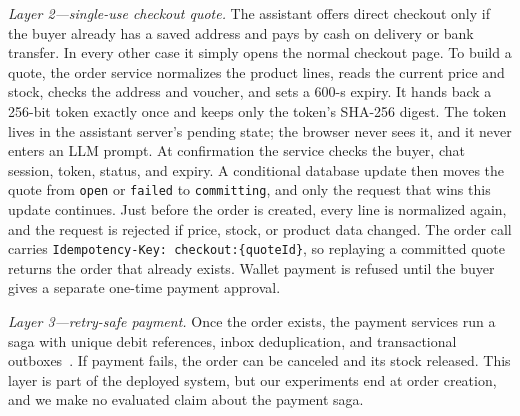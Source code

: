 \documentclass{IEEEtran}
\newcommand{\code}[1]{\texttt{\small #1}}
\begin{document}
\textit{Layer 2---single-use checkout quote.} The assistant offers direct checkout only if the buyer already has a saved address and pays by cash on delivery or bank transfer. In every other case it simply opens the normal checkout page. To build a quote, the order service normalizes the product lines, reads the current price and stock, checks the address and voucher, and sets a 600-s expiry. It hands back a 256-bit token exactly once and keeps only the token's SHA-256 digest. The token lives in the assistant server's pending state; the browser never sees it, and it never enters an LLM prompt. At confirmation the service checks the buyer, chat session, token, status, and expiry. A conditional database update then moves the quote from \code{open} or \code{failed} to \code{committing}, and only the request that wins this update continues. Just before the order is created, every line is normalized again, and the request is rejected if price, stock, or product data changed. The order call carries \code{Idempotency-Key: checkout:\{quoteId\}}, so replaying a committed quote returns the order that already exists. Wallet payment is refused until the buyer gives a separate one-time payment approval.

\textit{Layer 3---retry-safe payment.} Once the order exists, the payment services run a saga with unique debit references, inbox deduplication, and transactional outboxes~\cite{richardson2018microservices}. If payment fails, the order can be canceled and its stock released. This layer is part of the deployed system, but our experiments end at order creation, and we make no evaluated claim about the payment saga.
\end{document}
